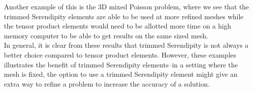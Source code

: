 \documentclass[manuscript,screen]{acmart}
\begin{document}
\noindent Another example of this is the 3D mixed Poisson problem, where we see that the trimmed Serendipity elements are able to be used at more refined meshes while the tensor product elements would need to be allotted more time on a high memory computer to be able to get results on the same sized mesh.  \\

\noindent In general, it is clear from these results that trimmed Serendipity is not always a better choice compared to tensor product elements.  However, these examples illustrates the benefit of trimmed Serendipity elements--in a setting where the mesh is fixed, the option to use a trimmed Serendipity element might give an extra way to refine a problem to increase the accuracy of a solution.

\end{document}
